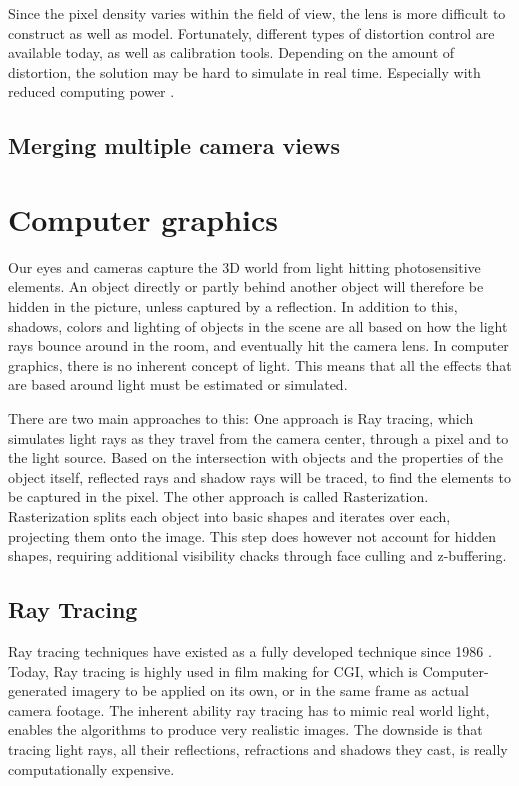 Since the pixel density varies within the field of view, the lens is more difficult to construct as well as model. Fortunately, different types of distortion control are available today, as well as calibration tools. Depending on the amount of distortion, the solution may be hard to simulate in real time. Especially with reduced computing power .

\subsection{Merging multiple camera views}



\section{Computer graphics}

Our eyes and cameras capture the 3D world from light hitting photosensitive elements. An object directly or partly behind another object will therefore be hidden in the picture, unless captured by a reflection. In addition to this, shadows, colors and lighting of objects in the scene are all based on how the light rays bounce around in the room, and eventually hit the camera lens. In computer graphics, there is no inherent concept of light. This means that all the effects that are based around light must be estimated or simulated. 

There are two main approaches to this: One approach is Ray tracing, which simulates light rays as they travel from the camera center, through a pixel and to the light source. Based on the intersection with objects and the properties of the object itself, reflected rays and shadow rays will be traced, to find the elements to be captured in the pixel. The other approach is called Rasterization. Rasterization splits each object into basic shapes and iterates over each, projecting them onto the image. This step does however not account for hidden shapes, requiring additional visibility chacks through face culling and z-buffering. 

\subsection{Ray Tracing}

Ray tracing techniques have existed as a fully developed technique since 1986 \cite{raytraceblog}. Today, Ray tracing is highly used in film making for CGI, which is Computer-generated imagery to be applied on its own, or in the same frame as actual camera footage. The inherent ability ray tracing has to mimic real world light, enables the algorithms to produce very realistic images. The downside is that tracing light rays, all their reflections, refractions and shadows they cast, is really computationally expensive.

